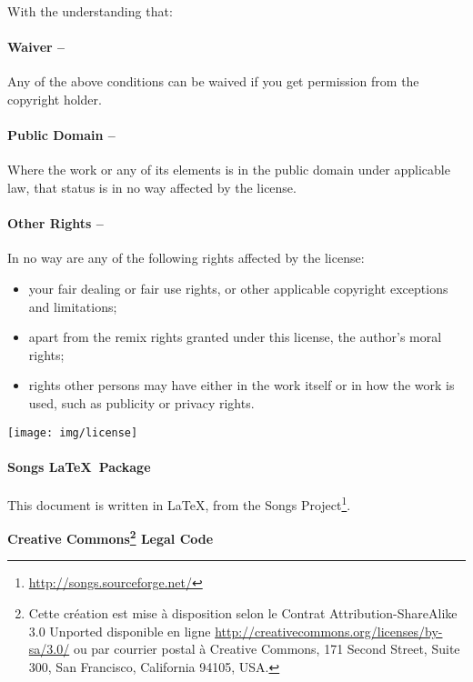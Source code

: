 {\begin{lblock}{With the understanding that:}
    \hspace{0.4cm}
    \parbox{15cm}{
      \paragraph{Waiver --}
      Any of the above conditions can be waived if you get permission
      from the copyright holder.

      \paragraph{Public Domain --}
      Where the work or any of its elements is in the public domain
      under applicable law, that status is in no way affected by the
      license.

      \paragraph{Other Rights --}
      In no way are any of the following rights affected by the license:
      \begin{itemize}
      \item your fair dealing or fair use rights, or other applicable
        copyright exceptions and limitations;
      \item apart from the remix rights granted under this license,
        the author's moral rights;
      \item rights other persons may have either in the work itself
        or in how the work is used, such as publicity or privacy rights.
      \end{itemize}
    }

    \begin{center}
      \texttt{[image: img/license]}
    \end{center}

  \end{lblock}
  \paragraph{Songs \LaTeX~Package}
  This document is written in \LaTeX, from the Songs
  Project\footnote{\url{http://songs.sourceforge.net/}}.
}{
  \begin{center}
    \textbf{\LARGE{Creative Commons\footnote{ Cette création est mise à
          disposition selon le Contrat Attribution-ShareAlike 3.0
          Unported disponible en ligne
          \url{http://creativecommons.org/licenses/by-sa/3.0/} ou par
          courrier postal à Creative Commons, 171 Second Street, Suite
          300, San Francisco, California 94105, USA.} Legal Code} }
  \end{center}

}
